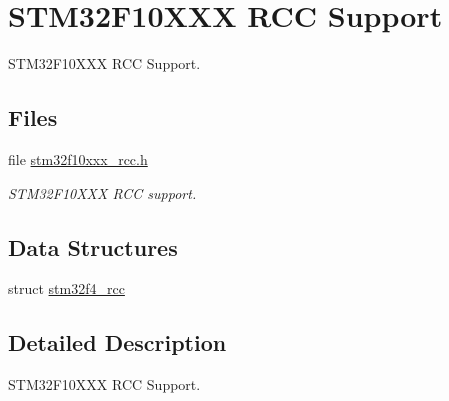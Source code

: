 \hypertarget{group__stm32f10xxx__rcc}{}\section{S\+T\+M32\+F10\+X\+XX R\+CC Support}
\label{group__stm32f10xxx__rcc}


S\+T\+M32\+F10\+X\+XX R\+CC Support.  


\subsection*{Files}
\begin{DoxyCompactItemize}
\item 
file \mbox{\hyperlink{stm32f10xxx__rcc_8h}{stm32f10xxx\+\_\+rcc.\+h}}
\begin{DoxyCompactList}\small\item\em S\+T\+M32\+F10\+X\+XX R\+CC support. \end{DoxyCompactList}\end{DoxyCompactItemize}
\subsection*{Data Structures}
\begin{DoxyCompactItemize}
\item 
struct \mbox{\hyperlink{structstm32f4__rcc}{stm32f4\+\_\+rcc}}
\end{DoxyCompactItemize}


\subsection{Detailed Description}
S\+T\+M32\+F10\+X\+XX R\+CC Support. 

